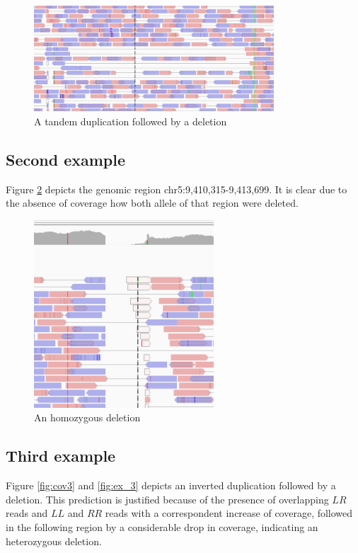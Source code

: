     \begin{figure}[H]
        \centering
        \includegraphics[width=0.8\textwidth]{pos1.PNG}
        \caption{A tandem duplication followed by a deletion}
        \label{fig:task_a}
    \end{figure}

    \subsection{Second example}
    Figure \ref{fig:task_b} depicts the genomic region chr5:9,410,315-9,413,699.
    It is clear due to the absence of coverage how both allele of that region were deleted.

    \begin{figure}[H]
        \centering
        \includegraphics[width=0.6\textwidth]{pos2.PNG}
        \caption{An homozygous deletion}
         \label{fig:task_b}
    \end{figure}

    \subsection{Third example}
    Figure \ref{fig:cov3} and \ref{fig:ex_3} depicts an inverted duplication followed by a deletion.
    This prediction is justified because of the presence of overlapping $LR$ reads and $LL$ and $RR$ reads with a correspondent increase of coverage, followed in the following region by a considerable drop in coverage, indicating an heterozygous deletion.


